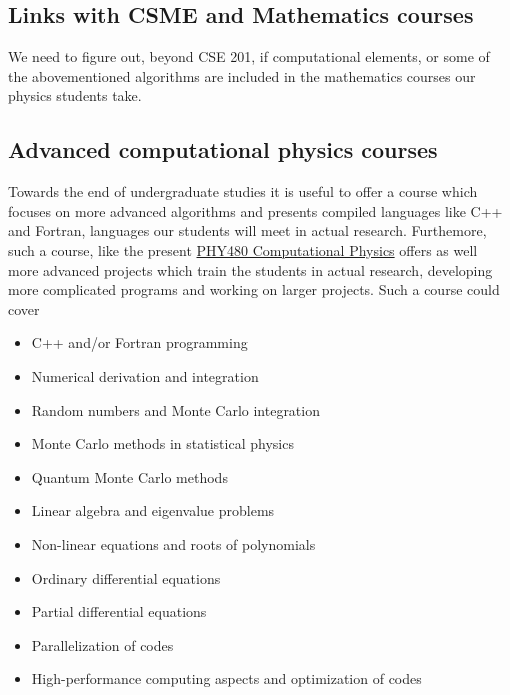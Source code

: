 \documentclass[%
oneside,                 %
final,                   %
10pt]{article}
\begin{document}
\subsection*{Links with CSME and Mathematics courses}

We need to figure out, beyond CSE 201, if computational elements, or some of the abovementioned algorithms are included in the mathematics courses our physics students take.


\subsection*{Advanced computational physics courses}

Towards the end of undergraduate studies it is useful to offer a course which focuses on more advanced algorithms and presents compiled languages like C++ and Fortran, languages our students will meet in actual research.
Furthemore, such a course, like the present \href{{https://github.com/CompPhysics/ComputationalPhysicsMSU}}{PHY480 Computational Physics} offers as well more advanced projects which train the students in actual research, developing more complicated programs and working on larger projects.
Such a course could cover
\begin{itemize}
  \item C++ and/or Fortran programming

  \item Numerical derivation and integration

  \item Random numbers and Monte Carlo integration

  \item Monte Carlo methods in statistical physics

  \item Quantum Monte Carlo methods

  \item Linear algebra and eigenvalue problems

  \item Non-linear equations and roots of polynomials

  \item Ordinary differential equations

  \item Partial differential equations

  \item Parallelization of codes

  \item High-performance computing aspects and optimization of codes
\end{itemize}
\end{document}
